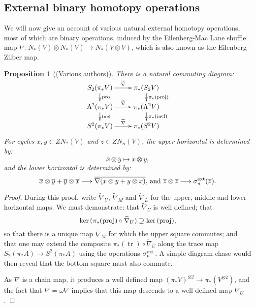 \documentclass[11pt]{amsart} \renewcommand{\baselinestretch}{1.2}
\theoremstyle{plain}
\newtheorem{prop}[thm]{Proposition}
\numberwithin{equation}{section} %
\theoremstyle{plain}
\newtheorem{prop}[thm]{Proposition}
\numberwithin{equation}{chapter} %
\renewcommand{\ker}{\mathrm{ker}\,}
\DeclareMathOperator{\trace}{tr}
\renewcommand{\to}{\longrightarrow}
\newcommand{\calV}{\mathcal{V}}
\newcommand{\vect}[2]{\calV^{#1}_{#2}}
\newcommand{\twist}{\omega}
\renewcommand{\mapsto}{\longmapsto}
\newcommand{\SubsectionOrSection}[1]{\subsection{#1}}
\begin{document}
\begin{Constructing homotopy operations}
\SubsectionOrSection{External binary homotopy operations}\label{External binary homotopy operations}
We will now give an account of various natural external homotopy operations, most of which are binary operations, induced by the  Eilenberg-Mac Lane shuffle map $\nabla:N_*(V)\otimes N_*(V)\to N_*(V\otimes V)$, which is also known as the Eilenberg-Zilber map.
\begin{prop}[(Various authors)]
\label{the top external homotopy operations}
There is a natural commuting diagram:
\[\xymatrix@R=4mm{
S_2(\pi_*V)\ar[r]^-{\smash{\widetilde{\nabla}}}
\ar[d]^-{\textup{proj}}
&%
\pi_*(S_2V)\ar[d]^-{\pi_*(\textup{proj})}
\\%
\Lambda^2(\pi_*V)\ar[r]^-{\widetilde{\nabla}}
\ar[d]^-{\textup{incl}}
&%
\pi_*(\Lambda^2V)\ar[d]^-{\pi_*(\textup{incl})}
\\%
S^2(\pi_*V)\ar[r]^-{\widetilde{\nabla}}&%
\pi_*(S^2V)%
}\]
For cycles $x,y\in ZN_*(V)$ and $z\in ZN_n(V)$, the upper horizontal is determined by:
\[\overline{x}\otimes\overline{y}\mapsto \overline{x\otimes y},\]
and the lower horizontal is determined by:
\[\overline{x}\otimes\overline{y}+\overline{y}\otimes \overline{x}\mapsto\overline{\nabla(x\otimes y+y\otimes x)}\textup{, and }\overline{z}\otimes\overline{z}\mapsto\sigma^\textup{ext}_n(\overline{z}).\]
\end{prop}
\begin{proof}
During this proof, write $\widetilde{\nabla}_U$, $\widetilde{\nabla}_M$ and $\widetilde{\nabla}_L$ for the upper, middle and lower horizontal maps. We must demonstrate: that $\widetilde{\nabla}_U$  is well defined; that
\[\ker(\pi_*(\textup{proj})\circ\widetilde{\nabla}_U)\supseteq\ker(\textup{proj}),\]
so that there is a unique map $\widetilde{\nabla}_M$ for which the upper square commutes; and that one may extend the composite $\pi_*(\trace)\circ\widetilde{\nabla}_U$ along the trace map $S_2(\pi_*A)\to S^2(\pi_*A)$ using the operations
$\sigma_n^\textup{ext}$.
A simple diagram chase would then reveal that the bottom square must also commute.

As $\nabla$ is a chain  map, it produces a well defined map $(\pi_*V)^{\otimes2}\to \pi_*(V^{\otimes2})$, and the fact that $\nabla=\twist\nabla$ implies that this map descends to a well defined map $\nabla_U$.


\end{proof}
\end{Constructing homotopy operations}
\end{document}
